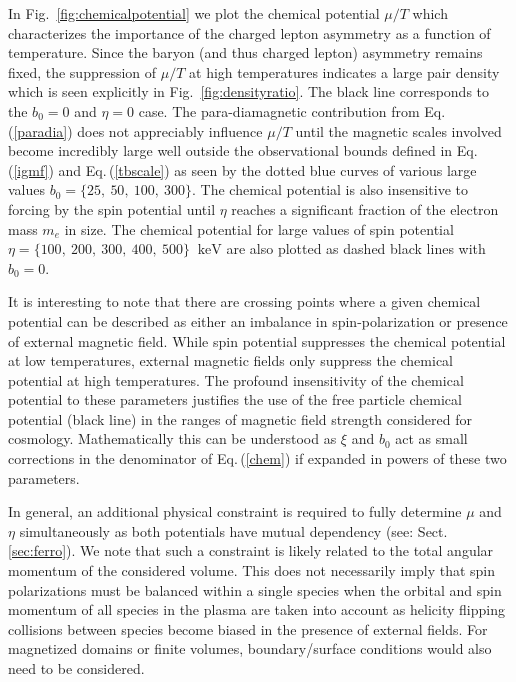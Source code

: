 \documentclass[reprint]{revtex4-2}
\newcommand*{\keV}{\text{ keV}}
\newcommand{\req}[1]{Eq.\,(\ref{#1})}
\newcommand{\rf}[1]{Fig.~{\ref{#1}}}
\newcommand{\rsec}[1]{Sect.\,{\ref{#1}}}
\begin{document}
In \rf{fig:chemicalpotential} we plot the chemical potential $\mu/T$ which characterizes the importance of the charged lepton asymmetry as a function of temperature. Since the baryon (and thus charged lepton) asymmetry remains fixed, the suppression of $\mu/T$ at high temperatures indicates a large pair density which is seen explicitly in \rf{fig:densityratio}. The black line corresponds to the $b_{0}=0$ and $\eta=0$ case. The para-diamagnetic contribution from \req{paradia} does not appreciably influence $\mu/T$ until the magnetic scales involved become incredibly large well outside the observational bounds defined in \req{igmf} and \req{tbscale} as seen by the dotted blue curves of various large values $b_{0}=\{25,\ 50,\ 100,\ 300\}$. The chemical potential is also insensitive to forcing by the spin potential until $\eta$ reaches a significant fraction of the electron mass $m_{e}$ in size. The chemical potential for large values of spin potential $\eta=\{100,\ 200,\ 300,\ 400,\ 500\}\ \keV$ are also plotted as dashed black lines with $b_{0}=0$.

It is interesting to note that there are crossing points where a given chemical potential can be described as either an imbalance in spin-polarization or presence of external magnetic field. While spin potential suppresses the chemical potential at low temperatures, external magnetic fields only suppress the chemical potential at high temperatures. The profound insensitivity of the chemical potential to these parameters justifies the use of the free particle chemical potential (black line) in the ranges of magnetic field strength considered for cosmology. Mathematically this can be understood as $\xi$ and $b_{0}$ act as small corrections in the denominator of \req{chem} if expanded in powers of these two parameters.

In general, an additional physical constraint is required to fully determine $\mu$ and $\eta$ simultaneously as both potentials have mutual dependency (see: \rsec{sec:ferro}). We note that such a constraint is likely related to the total angular momentum of the considered volume. This does not necessarily imply that spin polarizations must be balanced within a single species when the orbital and spin momentum of all species in the plasma are taken into account as helicity flipping collisions between species become biased in the presence of external fields. For magnetized domains or finite volumes, boundary/surface conditions would also need to be considered.
\end{document}
